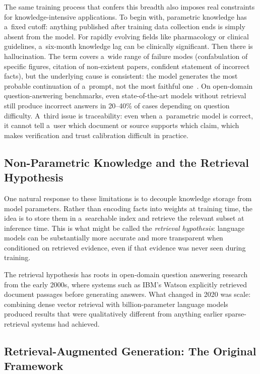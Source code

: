 The same training process that confers this breadth also imposes real constraints
for knowledge-intensive applications.
To begin with, parametric knowledge has a~fixed cutoff: anything published after
training data collection ends is simply absent from the model.
For rapidly evolving fields like pharmacology or clinical guidelines, a~six-month
knowledge lag can be clinically significant.
Then there is hallucination.
The term covers a~wide range of failure modes (confabulation of specific figures,
citation of non-existent papers, confident statement of incorrect facts), but
the underlying cause is consistent: the model generates the most probable
continuation of a~prompt, not the most faithful one~\cite{ji2023hallucination}.
On open-domain question-answering benchmarks, even state-of-the-art models without
retrieval still produce incorrect answers in 20--40\% of cases depending on
question difficulty.
A~third issue is traceability: even when a~parametric model is correct,
it cannot tell a~user which document or source supports which claim,
which makes verification and trust calibration difficult in practice.

\subsection{Non-Parametric Knowledge and the Retrieval Hypothesis}

One natural response to these limitations is to decouple knowledge storage from
model parameters.
Rather than encoding facts into weights at training time, the idea is to store them
in a~searchable index and retrieve the relevant subset at inference time.
This is what might be called the \emph{retrieval hypothesis}: language models can
be substantially more accurate and more transparent when conditioned on retrieved
evidence, even if that evidence was never seen during training.

The retrieval hypothesis has roots in open-domain question answering research
from the early 2000s, where systems such as IBM's Watson explicitly retrieved
document passages before generating answers.
What changed in 2020 was scale: combining dense vector retrieval with
billion-parameter language models produced results that were qualitatively
different from anything earlier sparse-retrieval systems had achieved.

\subsection{Retrieval-Augmented Generation: The Original Framework}

